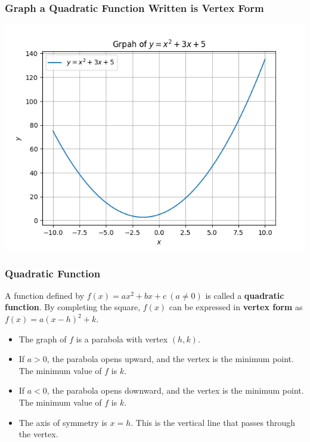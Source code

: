 \documentclass{beamer}
\begin{document}
\begin{frame}
    \frametitle{Graph a Quadratic Function Written is Vertex Form}
    \includegraphics[scale=0.5]{figs/Figure_3.png}
\end{frame}

\begin{frame}
    \frametitle{Quadratic Function}

    A function defined by \(f(x) = ax^2 +bx +c~ (a \ne 0)\) is called a \textbf{quadratic function}. By completing the square, \(f(x)\) can be expressed in \textbf{vertex form} as \(f(x)= a(x-h)^2+k\).\pause
    \begin{itemize}
        \item The graph of \(f\) is a parabola with vertex \((h,k)\). \pause
        \item If \(a>0\), the parabola opens upward, and the vertex is the minimum point. The minimum value of \(f\) is \(k\). \pause
        \item If \(a<0\), the parabola opens downward, and the vertex is the minimum point. The minimum value of \(f\) is \(k\). \pause
        \item The axis of symmetry is \(x=h\). This is the vertical line that passes through the vertex. 
    \end{itemize}

\end{frame}
\end{document}
